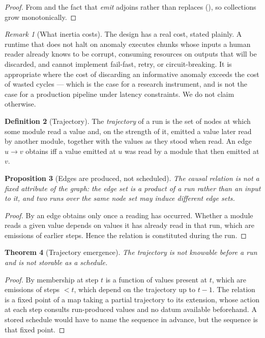 \documentclass[11pt,a4paper]{article}
\theoremstyle{clstyle}
\newtheorem{theorem}{Theorem}[section]
\newtheorem{proposition}[theorem]{Proposition}
\theoremstyle{definition}
\newtheorem{definition}[theorem]{Definition}
\theoremstyle{remark}
\newtheorem{remark}[theorem]{Remark}
\begin{document}
\begin{proof}
From  and the fact that \emph{emit} adjoins rather than
replaces (), so collections grow monotonically.
\end{proof}

\begin{remark}[What inertia costs]
\label{rem:inertia-cost}
The design has a real cost, stated plainly. A runtime that does not halt on
anomaly executes chunks whose inputs a human reader already knows to be
corrupt, consuming resources on outputs that will be discarded, and cannot
implement fail-fast, retry, or circuit-breaking. It is appropriate where the
cost of discarding an informative anomaly exceeds the cost of wasted cycles
--- which is the case for a research instrument, and is not the case for a
production pipeline under latency constraints. We do not claim otherwise.
\end{remark}

\begin{definition}[Trajectory]
\label{def:trajectory}
The \emph{trajectory} of a run is the set of nodes at which some module read
a value and, on the strength of it, emitted a value later read by another
module, together with the values as they stood when read. An edge
$u\to v$ obtains iff a value emitted at $u$ was read by a module that then
emitted at $v$.
\end{definition}

\begin{proposition}[Edges are produced, not scheduled]
\label{prop:edges}
The causal relation is not a fixed attribute of the graph: the edge set is a
product of a run rather than an input to it, and two runs over the same node
set may induce different edge sets.
\end{proposition}

\begin{proof}
By  an edge obtains only once a reading has occurred.
Whether a module reads a given value depends on values it has already read in
that run, which are emissions of earlier steps. Hence the relation is
constituted during the run.
\end{proof}

\begin{theorem}[Trajectory emergence]
\label{thm:emergence}
The trajectory is not knowable before a run and is not storable as a
schedule.
\end{theorem}

\begin{proof}
By  membership at step $t$ is a function of values present
at $t$, which are emissions of steps $<t$, which depend on the trajectory up
to $t-1$. The relation is a fixed point of a map taking a partial trajectory
to its extension, whose action at each step consults run-produced values and
no datum available beforehand. A stored schedule would have to name the
sequence in advance, but the sequence is that fixed point.
\end{proof}
\end{document}
